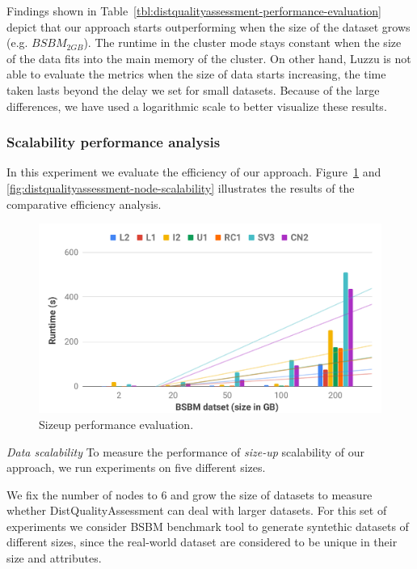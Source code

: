 Findings shown in Table~\ref{tbl:distqualityassessment-performance-evaluation} depict that our approach starts outperforming when the size of the dataset grows (e.g. $BSBM_{2GB}$).
The runtime in the cluster mode stays constant when the size of the data fits into the main memory of the cluster.
On other hand, Luzzu is not able to evaluate the metrics when the size of data starts increasing, the time taken lasts beyond the delay we set for small datasets. 
Because of the large differences, we have used a logarithmic scale to better visualize these results.

\subsubsection{Scalability performance analysis}
\label{subsubsection:distqualityassessment-scalability_performance}

In this experiment we evaluate the efficiency of our approach.
Figure~\ref{fig:distqualityassessment-sizeup-scalability} and \ref{fig:distqualityassessment-node-scalability} illustrates the results of the comparative efficiency analysis.

\begin{figure}
\centering
 \includegraphics[width=1.0\columnwidth]{images/5_distqualityassessment/distqualityassessment-sizeup-scalability.pdf}
    \caption{Sizeup performance evaluation.}
    \label{fig:distqualityassessment-sizeup-scalability}
\end{figure}

\textit{Data scalability} 
To measure the performance of \textit{size-up} scalability of our approach, we run experiments on five different sizes.

We fix the number of nodes to 6 and grow the size of datasets to measure whether DistQualityAssessment can deal with larger datasets.
For this set of experiments we consider BSBM benchmark tool to generate syntethic datasets of different sizes, since the real-world dataset are considered to be unique in their size and attributes.

